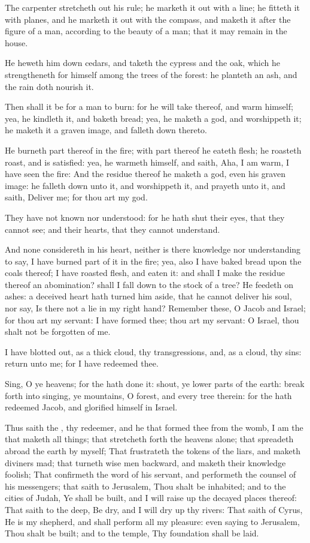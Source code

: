\verse The carpenter stretcheth out his rule; he marketh it out with a line; he fitteth it with planes, and he marketh it out with the compass, and maketh it after the figure of a man, according to the beauty of a man; that it may remain in the house.

\verse He heweth him down cedars, and taketh the cypress and the oak, which he strengtheneth for himself among the trees of the forest: he planteth an ash, and the rain doth nourish it.

\verse Then shall it be for a man to burn: for he will take thereof, and warm himself; yea, he kindleth it, and baketh bread; yea, he maketh a god, and worshippeth it; he maketh it a graven image, and falleth down thereto.

\verse He burneth part thereof in the fire; with part thereof he eateth flesh; he roasteth roast, and is satisfied: yea, he warmeth himself, and saith, Aha, I am warm, I have seen the fire: \verse And the residue thereof he maketh a god, even his graven image: he falleth down unto it, and worshippeth it, and prayeth unto it, and saith, Deliver me; for thou art my god.

\verse They have not known nor understood: for he hath shut their eyes, that they cannot see; and their hearts, that they cannot understand.

\verse And none considereth in his heart, neither is there knowledge nor understanding to say, I have burned part of it in the fire; yea, also I have baked bread upon the coals thereof; I have roasted flesh, and eaten it: and shall I make the residue thereof an abomination?  shall I fall down to the stock of a tree?  \verse He feedeth on ashes: a deceived heart hath turned him aside, that he cannot deliver his soul, nor say, Is there not a lie in my right hand?  \verse Remember these, O Jacob and Israel; for thou art my servant: I have formed thee; thou art my servant: O Israel, thou shalt not be forgotten of me.

\verse I have blotted out, as a thick cloud, thy transgressions, and, as a cloud, thy sins: return unto me; for I have redeemed thee.

\verse Sing, O ye heavens; for the \LORD hath done it: shout, ye lower parts of the earth: break forth into singing, ye mountains, O forest, and every tree therein: for the \LORD hath redeemed Jacob, and glorified himself in Israel.

\verse Thus saith the \LORD, thy redeemer, and he that formed thee from the womb, I am the \LORD that maketh all things; that stretcheth forth the heavens alone; that spreadeth abroad the earth by myself; \verse That frustrateth the tokens of the liars, and maketh diviners mad; that turneth wise men backward, and maketh their knowledge foolish; \verse That confirmeth the word of his servant, and performeth the counsel of his messengers; that saith to Jerusalem, Thou shalt be inhabited; and to the cities of Judah, Ye shall be built, and I will raise up the decayed places thereof: \verse That saith to the deep, Be dry, and I will dry up thy rivers: \verse That saith of Cyrus, He is my shepherd, and shall perform all my pleasure: even saying to Jerusalem, Thou shalt be built; and to the temple, Thy foundation shall be laid.


